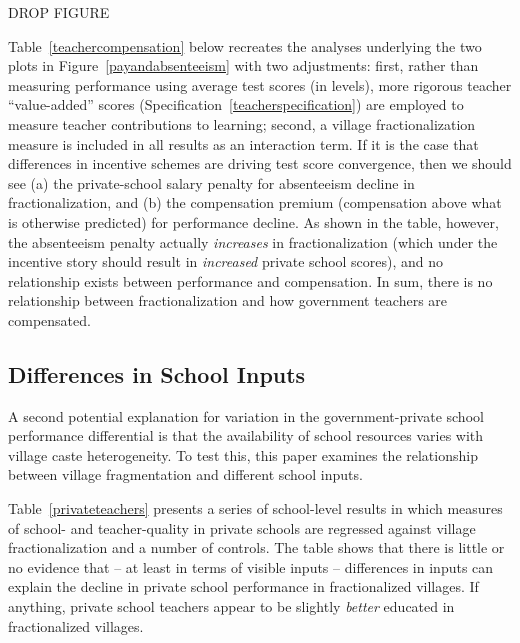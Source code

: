 \documentclass[Eubank_pk_ethnic_sorting.tex]{subfiles}
\begin{document}
DROP FIGURE


Table~\ref{teachercompensation} below recreates the analyses underlying the two plots in Figure~\ref{payandabsenteeism} with two adjustments: first, rather than measuring performance using average test scores (in levels), more rigorous teacher ``value-added'' scores (Specification~\ref{teacherspecification}) are employed to measure teacher contributions to learning; second, a village fractionalization measure is included in all results as an interaction term. If it is the case that differences in incentive schemes are driving test score convergence, then we should see (a) the private-school salary penalty for absenteeism decline in fractionalization, and (b) the compensation premium (compensation above what is otherwise predicted) for performance decline. As shown in the table, however, the absenteeism penalty actually \emph{increases} in fractionalization (which under the incentive story should result in \emph{increased} private school scores), and no relationship exists between performance and compensation. In sum, there is no relationship between fractionalization and how government teachers are compensated.





\subsection{Differences in School Inputs}

A second potential explanation for variation in the government-private school performance differential is that the availability of school resources varies with village caste heterogeneity. To test this, this paper examines the relationship between village fragmentation and different school inputs.

Table~\ref{privateteachers} presents a series of school-level results in which measures of school- and teacher-quality in private schools are regressed against village fractionalization and a number of controls. The table shows that there is little or no evidence that -- at least in terms of visible inputs -- differences in inputs can explain the decline in private school performance in fractionalized villages. If anything, private school teachers appear to be slightly \emph{better} educated in fractionalized villages.
\end{document}
